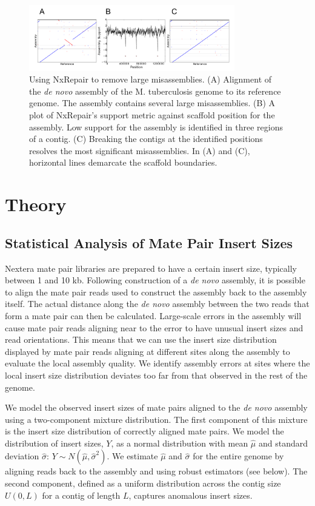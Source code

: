\begin{figure}
\centerline{\includegraphics[width=0.8\textwidth]{illumina/fig1_nxrepair.pdf}}
\caption{Using NxRepair to remove large misassemblies. (A) Alignment of the \textit{de novo} assembly of the M. tuberculosis genome to its reference genome. The assembly contains several large misassemblies. (B) A plot of NxRepair's support metric against scaffold position for the assembly. Low support for the assembly is identified in three regions of a contig. (C) Breaking the contigs at the identified positions resolves the most significant misassemblies. In (A) and (C), horizontal lines demarcate the scaffold boundaries.}\label{fig:NxRepair}
\end{figure}

\clearpage

\section{Theory}
\subsection{Statistical Analysis of Mate Pair Insert Sizes}
\label{sect:illumina_theory}
Nextera mate pair libraries are prepared to have a certain insert size, typically between 1 and 10 kb. Following construction of a \textit{de novo} assembly, it is possible to align the mate pair reads used to construct the assembly back to the assembly itself. The actual distance along the \textit{de novo} assembly between the two reads that form a mate pair can then be calculated. Large-scale errors in the assembly will cause mate pair reads aligning near to the error to have unusual insert sizes and read orientations. This means that we can use the insert size distribution displayed by mate pair reads aligning at different sites along the assembly to evaluate the local assembly quality. We identify assembly errors at sites where the local insert size distribution deviates too far from that observed in the rest of the genome.       

We model the observed insert sizes of mate pairs aligned to the \textit{de novo} assembly using a two-component mixture distribution. The first component of this mixture is the insert size distribution of correctly aligned mate pairs.  We model the distribution of insert sizes, $Y$, as a normal distribution with mean $\hat{\mu}$ and standard deviation $\hat{\sigma}$: $Y \sim N(\hat{\mu},\hat{\sigma}^2).$ We estimate $\hat{\mu}$ and $\hat{\sigma}$ for the entire genome by aligning reads back to the assembly and using robust estimators (see below). The second component, defined as a uniform distribution across the contig size $U(0,L)$ for a contig of length $L$, captures anomalous insert sizes. 


